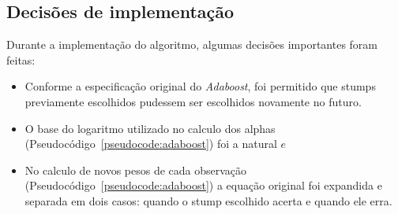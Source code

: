 \subsection{Decisões de implementação}
Durante a implementação do algoritmo, algumas decisões importantes foram feitas:

\begin{itemize}
	\item Conforme a especificação original do \emph{Adaboost}, foi permitido que stumps previamente escolhidos pudessem ser escolhidos novamente no futuro.
	\item O base do logaritmo utilizado no calculo dos alphas (Pseudocódigo~\ref{pseudocode:adaboost}) foi a natural $e$
	\item No calculo de novos pesos de cada observação (Pseudocódigo~\ref{pseudocode:adaboost}) a equação original foi expandida e separada em dois casos: quando o stump escolhido acerta e quando ele erra.
\end{itemize}








